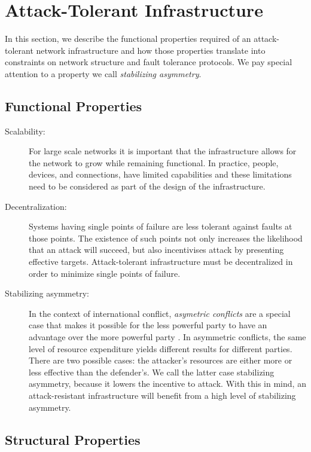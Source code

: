 \documentclass{sig-alternate-05-2015}
\begin{document}
\section{Attack-Tolerant Infrastructure}

In this section, we describe the functional properties required of an
attack-tolerant network infrastructure and how those properties translate
into constraints on network structure and fault tolerance protocols.
We pay special attention to a property we call
{\em stabilizing asymmetry}.

\subsection{Functional Properties}

\begin{description}
\item[Scalability:]
For large scale networks it is important that the infrastructure allows
for the network to grow while remaining functional.
In practice, people, devices, and connections, have limited capabilities
and these limitations need to be considered as part of the design of the
infrastructure. 

\item [Decentralization:]
Systems having single points of failure are less tolerant against faults at
those points.
The existence of such points not only increases the likelihood that an attack
will succeed,
but also incentivises attack by presenting effective targets.
Attack-tolerant infrastructure must be decentralized in order to
minimize single points of failure.

\item[Stabilizing asymmetry:]
In the context of international conflict,
{\em asymetric conflicts} are a special case that makes it possible for the
less powerful party to have an advantage over the more powerful party
\cite{mack_why_1975}.
In asymmetric conflicts, the same level of resource expenditure yields different
results for different parties.
There are two possible cases:
the attacker's resources are either more or less effective than the defender's.
We call the latter case stabilizing asymmetry,
because it lowers the incentive to attack.
With this in mind, an attack-resistant infrastructure will benefit from a high
level of stabilizing asymmetry.

\end{description}
\subsection{Structural Properties}
\end{document}
